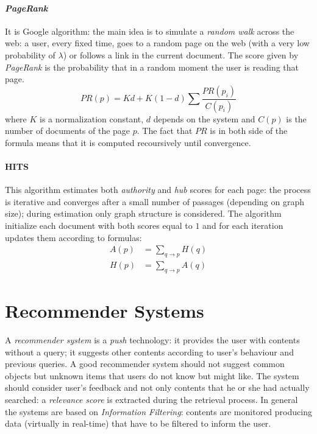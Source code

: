 \documentclass[11pt, a4page]{article}
\begin{document}
\subsection{\textit{PageRank}}
It is Google algorithm: the main idea is to simulate a \textit{random walk} across the web: a user, every fixed time, goes to a random page on the web (with a very low probability of $\lambda$) or follows a link in the current document.
The score given by \textit{PageRank} is the probability that in a random moment the user is reading that page.
\begin{equation*}
  PR(p) = Kd + K(1 - d)\sum \frac{PR(p_i)}{C(p_i)}
\end{equation*}
where $K$ is a normalization constant, $d$ depends on the system and $C(p)$ is the number of documents of the page $p$.
The fact that $PR$ is in both side of the formula means that it is computed recoursively until convergence.

\subsection{HITS}
This algorithm estimates both \textit{authority} and \textit{hub} scores for each page: the process is iterative and converges after a small number of passages (depending on graph size); during estimation only graph structure is considered.
The algorithm initialize each document with both scores equal to $1$ and for each iteration updates them according to formulas:
\begin{align*}
  A(p) &= \sum_{q \to p} H(q) \\
  H(p) &= \sum_{q \to p} A(q)
\end{align*}


\newpage
\part{Recommender Systems}
A \textit{recommender system} is a \textit{push} technology: it provides the user with contents without a query; it suggests other contents according to user's behaviour and previous queries.
A good recommender system should not suggest common objects but unknown items that users do not know but might like.
The system should consider user's feedback and not only contents that he or she had actually searched: a \textit{relevance score} is extracted during the retrieval process.
In general the systems are based on \textit{Information Filtering}: contents are monitored producing data (virtually in real-time) that have to be filtered to inform the user.
\end{document}
